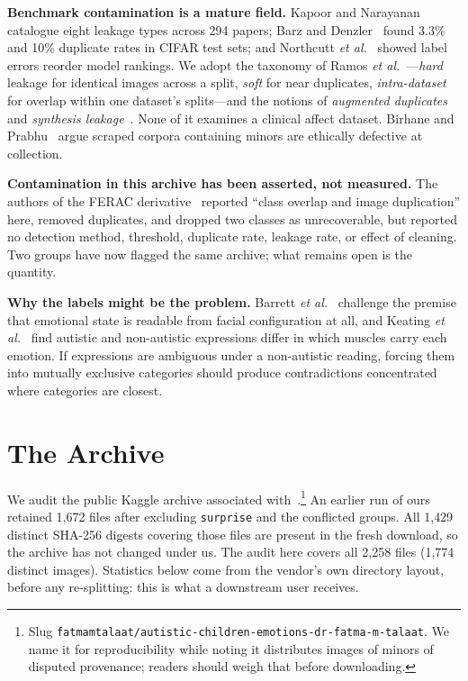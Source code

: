 \documentclass[conference,10pt]{IEEEtran}
\begin{document}
\textbf{Benchmark contamination is a mature field.} Kapoor and
Narayanan~\cite{kapoor2023} catalogue eight leakage types across 294 papers;
Barz and Denzler~\cite{barz2020} found 3.3\% and 10\% duplicate rates in CIFAR
test sets; and Northcutt \emph{et al.}~\cite{northcutt2021} showed label
errors reorder model rankings. We adopt the taxonomy of Ramos \emph{et
al.}~\cite{ramos2025}---\emph{hard} leakage for identical images across a split,
\emph{soft} for near duplicates, \emph{intra-dataset} for overlap within one
dataset's splits---and the notions of \emph{augmented
duplicates}~\cite{adimoolam2026} and \emph{synthesis
leakage}~\cite{apicella2025}. None of it examines a clinical affect dataset.
Birhane and Prabhu~\cite{birhane2021} argue scraped corpora containing minors
are ethically defective at collection.

\textbf{Contamination in this archive has been asserted, not measured.} The
authors of the FERAC derivative~\cite{ferac2024} reported ``class overlap and
image duplication'' here, removed duplicates, and dropped two classes as
unrecoverable, but reported no detection method, threshold, duplicate rate,
leakage rate, or effect of cleaning. Two groups have now flagged the same
archive; what remains open is the quantity.

\textbf{Why the labels might be the problem.} Barrett \emph{et
al.}~\cite{barrett2019} challenge the premise that emotional state is readable
from facial configuration at all, and Keating \emph{et al.}~\cite{keating2026}
find autistic and non-autistic expressions differ in which muscles carry each
emotion. If expressions are ambiguous under a non-autistic reading, forcing them
into mutually exclusive categories should produce contradictions concentrated
where categories are closest.

\section{The Archive}
\label{sec:archive}
We audit the public Kaggle archive associated
with~\cite{talaat2023retracted}.\footnote{Slug
\texttt{fatmamtalaat/}\-\texttt{autistic-}\-\texttt{children-}\-\texttt{emotions-}\-\texttt{dr-fatma-m-talaat}.
We name it for reproducibility while noting it distributes images of minors of
disputed provenance; readers should weigh that before downloading.} An earlier run of ours retained 1{,}672 files
after excluding \texttt{surprise} and the conflicted groups. All 1{,}429 distinct
SHA-256 digests covering those files are present in the fresh download, so the
archive has not changed under us. The audit here covers all 2{,}258 files
(1{,}774 distinct images). Statistics below come from the vendor's own directory layout, before
any re-splitting: this is what a downstream user receives.
\end{document}
